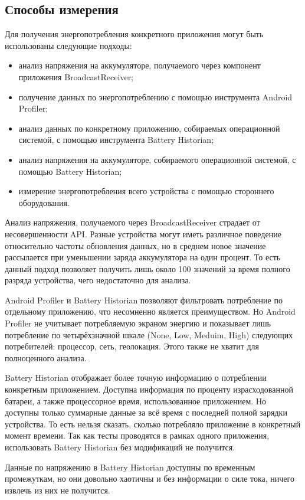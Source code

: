 \documentclass[a4paper,14pt]{extarticle} %
\begin{document}
	\subsection{Способы измерения}
	
	Для получения энергопотребления конкретного приложения могут быть использованы следующие подходы:
	\begin{itemize}
		\item анализ напряжения на аккумуляторе, получаемого через компонент приложения BroadcastReceiver;
		\item получение данных по энергопотреблению с помощью инструмента Android Profiler;
		\item анализ данных по конкретному приложению, собираемых операционной системой, с помощью инструмента Battery Historian;
		\item анализ напряжения на аккумуляторе, собираемого операционной системой, с помощью Battery Historian;
		\item измерение энергопотребления всего устройства с помощью стороннего оборудования.
	\end{itemize}

	Анализ напряжения, получаемого через BroadcastReceiver страдает от несовершенности API. Разные устройства могут иметь различное поведение относительно частоты обновления данных, но в среднем новое значение рассылается при уменьшении заряда аккумулятора на один процент. То есть данный подход позволяет получить лишь около 100 значений за время полного разряда устройства, чего недостаточно для анализа.
	
	Android Profiler и Battery Historian позволяют фильтровать потребление по отдельному приложению, что несомненно является преимуществом. Но Android Profiler не учитывает потребляемую экраном энергию и показывает лишь потребление по четырёхзначной шкале (None, Low, Meduim, High) следующих потребителей: процессор, сеть, геолокация. Этого также не хватит для полноценного анализа.
	
	Battery Historian отображает более точную информацию о потреблении конкретным приложением. Доступна информация по проценту израсходованной батареи, а также процессорное время, использованное приложением. Но доступны только суммарные данные за всё время с последней полной зарядки устройства. То есть нельзя сказать, сколько потребляло приложение в конкретный момент времени. Так как тесты проводятся в рамках одного приложения, использовать Battery Historian без модификаций не получится. 
	
	Данные по напряжению в Battery Historian доступны по временным промежуткам, но они довольно хаотичны \ris{\ref{fig:historian_voltage}} и без информации о силе тока, ничего извлечь из них не получится.
	
\end{document}
